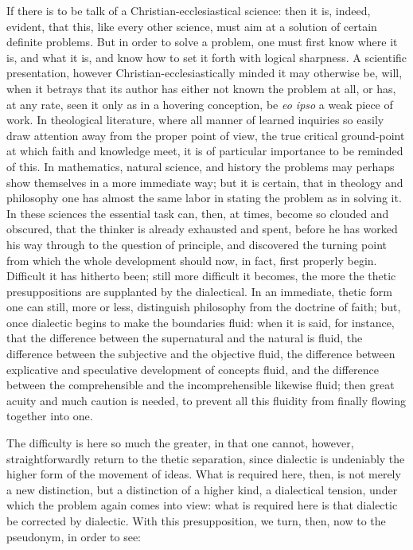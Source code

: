 \documentclass[12pt]{book}
\begin{document}
If there is to be talk of a Christian-ecclesiastical science: then it is, indeed, evident, that this, like every other science, must aim at a solution of certain definite problems. But in order to solve a problem, one must first know where it is, and what it is, and know how to set it forth with logical sharpness. A scientific presentation, however Christian-ecclesiastically minded it may otherwise be, will, when it betrays that its author
has either not known the problem at all, or has, at any rate, seen it only as in a hovering conception, be \textit{eo ipso} a weak piece of work. In theological literature, where all manner of learned inquiries so easily draw attention away from the proper point of view, the true critical ground-point at which faith and knowledge meet, it is of particular importance to be reminded of this. In mathematics, natural science, and history the problems may perhaps show themselves in a more immediate way; but it is certain, that in theology and philosophy one has almost the same labor in stating the problem as in solving it. In these sciences the essential task can, then, at times, become so clouded and obscured, that the thinker is already exhausted and spent, before he has worked his way through to the question of principle, and discovered the turning point from which the whole development should now, in fact, first properly begin. Difficult it has hitherto been; still more difficult it becomes, the more the thetic presuppositions are supplanted by the dialectical. In an immediate, thetic form one can still, more or less, distinguish philosophy from the doctrine of faith; but, once dialectic begins to make the boundaries fluid: when it is said, for instance, that the difference between the supernatural and the natural is fluid, the difference between the subjective and the objective fluid, the difference between explicative and speculative development of concepts fluid, and the difference between the comprehensible and the incomprehensible likewise fluid; then great acuity and much caution is needed,
to prevent all this fluidity from finally flowing together into one.

The difficulty is here so much the greater, in that one cannot, however, straightforwardly return to the thetic separation, since dialectic is undeniably the higher form of the movement of ideas. What is required here, then, is not merely a new distinction, but a distinction of a higher kind, a dialectical tension, under which the problem again comes into view: what is required here is that dialectic be corrected by dialectic. With this presupposition, we turn, then, now to the pseudonym, in order to see:
\end{document}
